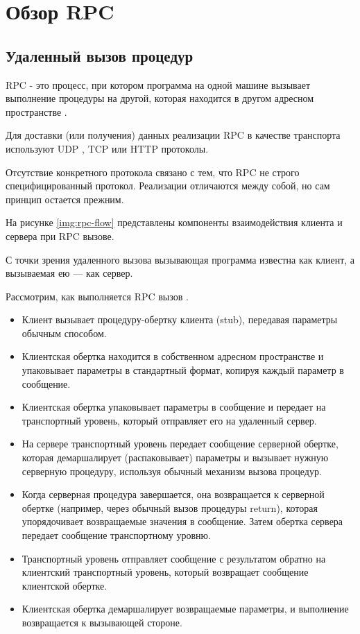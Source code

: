 \chapter{Обзор RPC}

\section{Удаленный вызов процедур}

RPC - это процесс, при котором программа на одной машине вызывает выполнение процедуры на другой, которая находится в другом адресном пространстве \cite{ibm-rpc}. 

Для доставки (или получения) данных реализации RPC в качестве транспорта используют UDP \cite{udp-info}, TCP \cite{tcp-info} или HTTP \cite{http-info} протоколы.

Отсутствие конкретного протокола связано с тем, что RPC не строго специфицированный протокол. Реализации отличаются между собой, но сам принцип остается прежним.  

На рисунке \ref{img:rpc-flow} представлены компоненты взаимодействия клиента и сервера при RPC вызове. 

С точки зрения удаленного вызова вызывающая программа известна как клиент, а вызываемая ею — как сервер.

Рассмотрим, как выполняется RPC вызов \cite{rpc-flow}.  

\begin{itemize}
\item Клиент вызывает процедуру-обертку клиента (stub), передавая параметры обычным способом. 
\item Клиентская обертка находится в собственном адресном пространстве и упаковывает параметры в стандартный формат, копируя каждый параметр в сообщение. 
\item Клиентская обертка упаковывает параметры в сообщение и передает на транспортный уровень, который отправляет его на удаленный сервер.
\item На сервере транспортный уровень передает сообщение серверной обертке, которая демаршалирует (распаковывает) параметры и вызывает нужную серверную процедуру, используя обычный механизм вызова процедур. 
\item Когда серверная процедура завершается, она возвращается к серверной обертке (например, через обычный вызов процедуры return), которая упорядочивает возвращаемые значения в сообщение. Затем обертка сервера передает сообщение транспортному уровню. 
\item Транспортный уровень отправляет сообщение с результатом обратно на клиентский транспортный уровень, который возвращает сообщение клиентской обертке. 
\item Клиентская обертка демаршалирует возвращаемые параметры, и выполнение возвращается к вызывающей стороне.
\end{itemize}


